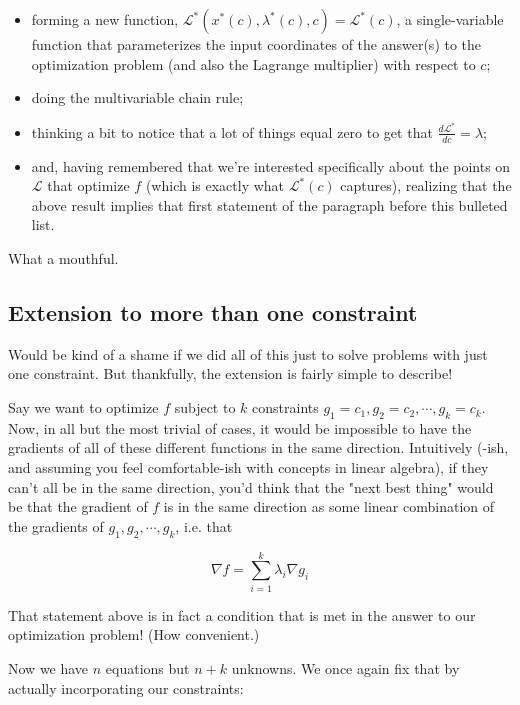 \documentclass[letterpaper,12pt]{report}
\providecommand{\tightlist}{%
  \setlength{\itemsep}{0pt}\setlength{\parskip}{0pt}}
\begin{document}
\begin{itemize}
\tightlist
\item
  forming a new function,
  \(\mathcal{L}^*(x^*(c), \lambda ^*(c), c) = \mathcal{L}^*(c)\), a
  single-variable function that parameterizes the input coordinates of
  the answer(s) to the optimization problem (and also the Lagrange
  multiplier) with respect to \(c\);
\item
  doing the multivariable chain rule;
\item
  thinking a bit to notice that a lot of things equal zero to get that
  \(\frac{d\mathcal{L}^*}{dc} = \lambda \);
\item
  and, having remembered that we're interested specifically about the
  points on \(\mathcal{L}\) that optimize \(f\) (which is exactly what
  \(\mathcal{L}^*(c)\) captures), realizing that the above result
  implies that first statement of the paragraph before this bulleted
  list.
\end{itemize}

What a mouthful.

\subsection{Extension to more than one
constraint}\label{extension-to-more-than-one-constraint}

Would be kind of a shame if we did all of this just to solve problems
with just one constraint. But thankfully, the extension is fairly simple
to describe!

Say we want to optimize \(f\) subject to \(k\) constraints
\(g_1 = c_1, g_2 = c_2, \cdots, g_k = c_k\). Now, in all but the most
trivial of cases, it would be impossible to have the gradients of all of
these different functions in the same direction. Intuitively (-ish, and
assuming you feel comfortable-ish with concepts in linear algebra), if
they can't all be in the same direction, you'd think that the "next best
thing" would be that the gradient of \(f\) is in the same direction as
some linear combination of the gradients of \(g_1, g_2, \cdots, g_k\),
i.e. that

\[ \nabla f = \sum_{i=1}^k \lambda _i \nabla g_i \]

That statement above is in fact a condition that is met in the answer to
our optimization problem! (How convenient.)

Now we have \(n\) equations but \(n+k\) unknowns. We once again fix that
by actually incorporating our constraints:
\end{document}
